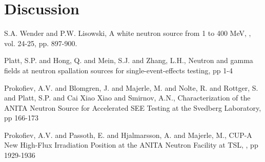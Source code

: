 \documentclass[11pt,a4paper]{IEEEtran}
\begin{document}
\section{Discussion}


\begin{thebibliography}{99} %

S.A. Wender and P.W. Lisowski,
\newblock A white neutron source from 1 to 400 MeV,										%
, vol. 24-25, pp. 897-900.					%

Platt, S.P. and Hong, Q. and Mein, S.J. and Zhang, L.H.,
\newblock Neutron and gamma fields at neutron spallation sources for single-event-effects testing,		%
 pp 1-4			%

Prokofiev, A.V. and Blomgren, J. and Majerle, M. and Nolte, R. and Rottger, S. and Platt, S.P. and Cai Xiao Xiao and Smirnov, A.N.,
\newblock Characterization of the ANITA Neutron Source for Accelerated SEE Testing at the Svedberg Laboratory,		%
 pp 166-173 									%

Prokofiev, A.V. and Passoth, E. and Hjalmarsson, A. and Majerle, M.,
\newblock CUP-A New High-Flux Irradiation Position at the ANITA Neutron Facility at TSL,		%
, pp 1929-1936 							%

\end{thebibliography}

\cleardoublepage

\todos
\end{document}
